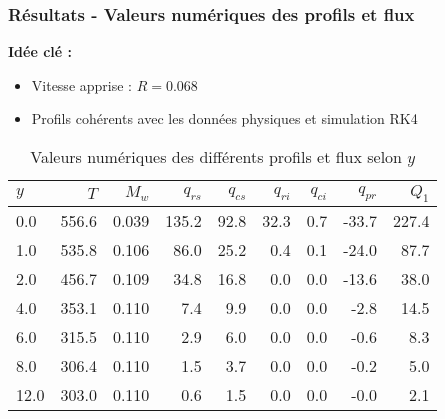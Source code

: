 \documentclass[handout]{beamer}
\newtheorem{pbm et hypo}[thm]{Problématique et hypothèses}
\begin{document}
	
	\begin{frame}
		\frametitle{Résultats - Valeurs numériques des profils et flux}
		
		\textbf{Idée clé :} 
		\begin{itemize}
			\item Vitesse apprise : $R = 0.068$
			\item Profils cohérents avec les données physiques et simulation RK4
		\end{itemize}
		
		\begin{center}
			\begin{table}[h]
				\footnotesize
				\caption{Valeurs numériques des différents profils et flux selon $y$}
				\begin{tabular}{@{}lrrrrrrrr@{}}
					\toprule
					$y$ & $T$ & $M_w$ & $q_{rs}$ & $q_{cs}$ & $q_{ri}$ & $q_{ci}$ & $q_{pr}$ & $Q_1$ \\
					\midrule
					0.0  & 556.6 & 0.039 & 135.2 & 92.8 & 32.3 & 0.7 & -33.7 & 227.4 \\
					1.0  & 535.8 & 0.106 & 86.0 & 25.2 & 0.4 & 0.1 & -24.0 & 87.7 \\
					2.0  & 456.7 & 0.109 & 34.8 & 16.8 & 0.0 & 0.0 & -13.6 & 38.0 \\
					4.0  & 353.1 & 0.110 & 7.4 & 9.9 & 0.0 & 0.0 & -2.8 & 14.5 \\
					6.0  & 315.5 & 0.110 & 2.9 & 6.0 & 0.0 & 0.0 & -0.6 & 8.3 \\
					8.0  & 306.4 & 0.110 & 1.5 & 3.7 & 0.0 & 0.0 & -0.2 & 5.0 \\
					12.0 & 303.0 & 0.110 & 0.6 & 1.5 & 0.0 & 0.0 & -0.0 & 2.1 \\
					\bottomrule
				\end{tabular}
			\end{table}
		\end{center}
	\end{frame}
	
\end{document}
